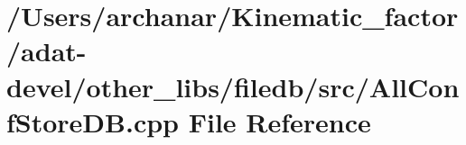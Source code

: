 \hypertarget{adat-devel_2other__libs_2filedb_2src_2AllConfStoreDB_8cpp}{}\section{/\+Users/archanar/\+Kinematic\+\_\+factor/adat-\/devel/other\+\_\+libs/filedb/src/\+All\+Conf\+Store\+DB.cpp File Reference}
\label{adat-devel_2other__libs_2filedb_2src_2AllConfStoreDB_8cpp}
